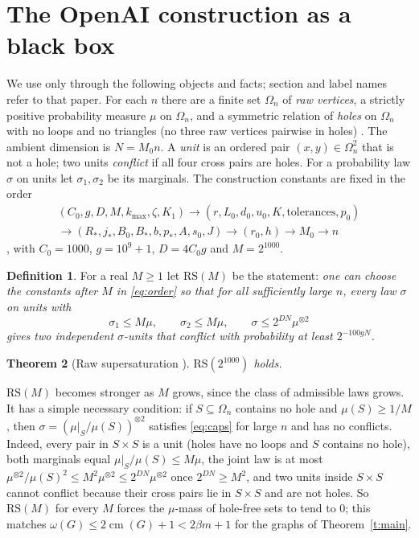 \documentclass[11pt]{article}
\newtheorem{theorem}{Theorem}[section]
\theoremstyle{definition}\newtheorem{conjecture}[theorem]{Conjecture}
\newtheorem{definition}[theorem]{Definition}
\theoremstyle{remark}\newtheorem{remark}[theorem]{Remark}
\newcommand{\cm}{\operatorname{cm}}
\newcommand{\RS}{\mathrm{RS}}
\begin{document}
\section{The OpenAI construction as a black box}\label{s:box}
We use \cite{OAIH} only through the following objects and facts; section and label names refer to that paper.
For each $n$ there are a finite set $\Omega_n$ of \emph{raw vertices}, a strictly positive probability measure $\mu$ on
$\Omega_n$, and a symmetric relation of \emph{holes} on $\Omega_n$ with no loops and no triangles (no three raw vertices
pairwise in holes) \cite[lem:hole-triangle-free]{OAIH}. The ambient dimension is $N=M_0n$. A \emph{unit} is an ordered pair
$(x,y)\in\Omega_n^2$ that is not a hole; two units \emph{conflict} if all four cross pairs are holes. For a probability law
$\sigma$ on units let $\sigma_1,\sigma_2$ be its marginals. The construction constants are fixed in the order
\begin{equation}\label{eq:order}
 \begin{gathered}
 (C_0,g,D,M,k_{\max},\zeta,K_1)\to(r,L_0,d_0,u_0,K,\text{tolerances},p_0)\\
 \to(R_*,j_*,B_0,B_*,b,p_*,A,s_0,J)\to(r_0,h)\to M_0\to n
 \end{gathered}
\end{equation}
\cite[Section~14]{OAIH}, with $C_0=1000$, $g=10^9+1$, $D=4C_0g$ and $M=2^{1000}$.

\begin{definition}
For a real $M\ge1$ let $\RS(M)$ be the statement: \emph{one can choose the constants after $M$ in \eqref{eq:order} so that for
all sufficiently large $n$, every law $\sigma$ on units with}
\begin{equation}\label{eq:caps}
 \sigma_1\le M\mu,\qquad\sigma_2\le M\mu,\qquad \sigma\le2^{DN}\mu^{\otimes2}
\end{equation}
\emph{gives two independent $\sigma$-units that conflict with probability at least $2^{-100gN}$.}
\end{definition}

\begin{theorem}[Raw supersaturation {\cite[thm:raw-supersaturation]{OAIH}}]\label{t:rs}
$\RS(2^{1000})$ holds.
\end{theorem}

$\RS(M)$ becomes stronger as $M$ grows, since the class of admissible laws grows. It has a simple necessary condition:
if $S\subseteq\Omega_n$ contains no hole and $\mu(S)\ge1/M$, then $\sigma=(\mu|_S/\mu(S))^{\otimes2}$ satisfies
\eqref{eq:caps} for large $n$ and has no conflicts. Indeed, every pair in $S\times S$ is a unit (holes have no loops and $S$
contains no hole), both marginals equal $\mu|_S/\mu(S)\le M\mu$, the joint law is at most
$\mu^{\otimes2}/\mu(S)^2\le M^2\mu^{\otimes2}\le2^{DN}\mu^{\otimes2}$ once $2^{DN}\ge M^2$, and two units inside
$S\times S$ cannot conflict because their cross pairs lie in $S\times S$ and are not holes. So $\RS(M)$ for every $M$ forces
the $\mu$-mass of hole-free sets to tend to $0$; this matches $\omega(G)\le2\cm(G)+1<2\beta m+1$ for the graphs of
Theorem~\ref{t:main}.
\end{document}
